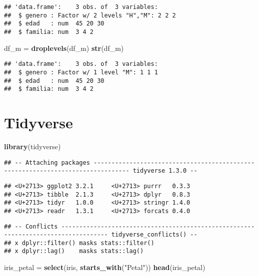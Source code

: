 \documentclass[
]{article}
\newenvironment{Shaded}{\begin{snugshade}}{\end{snugshade}}
\newcommand{\KeywordTok}[1]{\textcolor[rgb]{0.13,0.29,0.53}{\textbf{#1}}}
\newcommand{\NormalTok}[1]{#1}
\newcommand{\StringTok}[1]{\textcolor[rgb]{0.31,0.60,0.02}{#1}}
\begin{document}
\begin{verbatim}
## 'data.frame':    3 obs. of  3 variables:
##  $ genero : Factor w/ 2 levels "H","M": 2 2 2
##  $ edad   : num  45 20 30
##  $ familia: num  3 4 2
\end{verbatim}

\begin{Shaded}
\begin{Highlighting}[]
\NormalTok{df_m =}\StringTok{ }\KeywordTok{droplevels}\NormalTok{(df_m)}
\KeywordTok{str}\NormalTok{(df_m)}
\end{Highlighting}
\end{Shaded}

\begin{verbatim}
## 'data.frame':    3 obs. of  3 variables:
##  $ genero : Factor w/ 1 level "M": 1 1 1
##  $ edad   : num  45 20 30
##  $ familia: num  3 4 2
\end{verbatim}

\hypertarget{tidyverse}{%
\section{Tidyverse}\label{tidyverse}}

\begin{Shaded}
\begin{Highlighting}[]
\KeywordTok{library}\NormalTok{(tidyverse)}
\end{Highlighting}
\end{Shaded}

\begin{verbatim}
## -- Attaching packages -------------------------------------------------------------------------------- tidyverse 1.3.0 --
\end{verbatim}

\begin{verbatim}
## <U+2713> ggplot2 3.2.1     <U+2713> purrr   0.3.3
## <U+2713> tibble  2.1.3     <U+2713> dplyr   0.8.3
## <U+2713> tidyr   1.0.0     <U+2713> stringr 1.4.0
## <U+2713> readr   1.3.1     <U+2713> forcats 0.4.0
\end{verbatim}

\begin{verbatim}
## -- Conflicts ----------------------------------------------------------------------------------- tidyverse_conflicts() --
## x dplyr::filter() masks stats::filter()
## x dplyr::lag()    masks stats::lag()
\end{verbatim}

\begin{Shaded}
\begin{Highlighting}[]
\NormalTok{iris_petal =}\StringTok{ }\KeywordTok{select}\NormalTok{(iris, }\KeywordTok{starts_with}\NormalTok{(}\StringTok{"Petal"}\NormalTok{))}
\KeywordTok{head}\NormalTok{(iris_petal)}
\end{Highlighting}
\end{Shaded}
\end{document}
